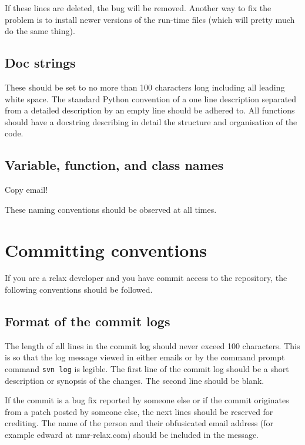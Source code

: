 If these lines are deleted, the bug will be removed.  Another way to fix the problem is to install newer versions of the run-time files (which will pretty much do the same thing).


\subsection{Doc strings}

These should be set to no more than 100 characters long including all leading white space.  The standard Python convention of a one line description separated from a detailed description by an empty line should be adhered to.  All functions should have a docstring describing in detail the structure and organisation of the code.


\subsection{Variable, function, and class names}

Copy email!

These naming conventions should be observed at all times.




\section{Committing conventions}

If you are a relax developer and you have commit access to the repository, the following conventions should be followed.


\subsection{Format of the commit logs}

The length of all lines in the commit log should never exceed 100 characters.  This is so that the log message viewed in either emails or by the command prompt command \texttt{svn log} is legible.  The first line of the commit log should be a short description or synopsis of the changes.  The second line should be blank.

If the commit is a bug fix reported by someone else or if the commit originates from a patch posted by someone else, the next lines should be reserved for crediting.  The name of the person and their obfusicated email address (for example edward at nmr-relax.com) should be included in the message.

